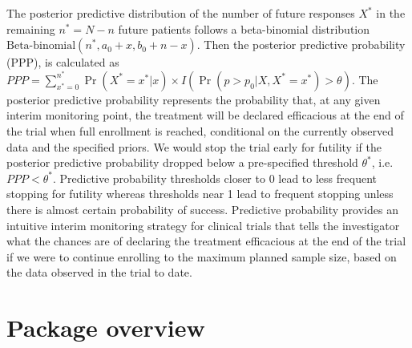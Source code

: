 The posterior predictive distribution of the number of future responses
\(X^*\) in the remaining \(n^*=N-n\) future patients follows a
beta-binomial distribution
\(\mbox{Beta-binomial}(n^*, a_0 + x, b_0 + n - x)\). Then the posterior
predictive probability (PPP), is calculated as
\(PPP = \sum_{{x^*}=0}^{n^*} \Pr(X^*=x^*|x) \times I(\Pr(p>p_0 | X, X^*=x^*) > \theta)\).
The posterior predictive probability represents the probability that, at
any given interim monitoring point, the treatment will be declared
efficacious at the end of the trial when full enrollment is reached,
conditional on the currently observed data and the specified priors. We
would stop the trial early for futility if the posterior predictive
probability dropped below a pre-specified threshold \(\theta^*\),
i.e.~\(PPP<\theta^*\). Predictive probability thresholds closer to 0
lead to less frequent stopping for futility whereas thresholds near 1
lead to frequent stopping unless there is almost certain probability of
success. Predictive probability provides an intuitive interim monitoring
strategy for clinical trials that tells the investigator what the
chances are of declaring the treatment efficacious at the end of the
trial if we were to continue enrolling to the maximum planned sample
size, based on the data observed in the trial to date.

\hypertarget{package-overview}{%
\section{Package overview}\label{package-overview}}

